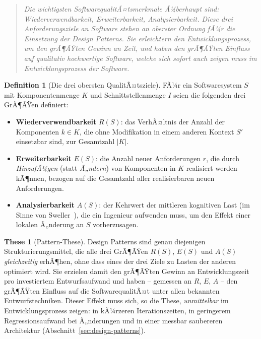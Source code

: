 ﻿\documentclass[a4paper,12pt]{report}
\theoremstyle{definition}
\newtheorem{definition}{Definition}[section]
\newtheorem{these}{These}[section]
\begin{document}
\begin{quotation}
\noindent\textit{%
Die wichtigsten SoftwarequalitÃ¤tsmerkmale Ã¼berhaupt sind: Wiederverwendbarkeit,
Erweiterbarkeit, Analysierbarkeit. Diese drei Anforderungsziele an Software stehen
an oberster Ordnung fÃ¼r die Einsetzung der Design Patterns. Sie erleichtern den
Entwicklungsprozess, um den grÃ¶ÃŸten Gewinn an Zeit, und haben den grÃ¶ÃŸten Einfluss
auf qualitativ hochwertige Software, welche sich sofort auch zeigen muss im
Entwicklungsprozess der Software.
}
\end{quotation}

\begin{definition}[Die drei obersten QualitÃ¤tsziele]
\label{def:qualitaetsziele}
FÃ¼r ein Softwaresystem $S$ mit Komponentenmenge $K$ und Schnittstellenmenge $I$
seien die folgenden drei GrÃ¶ÃŸen definiert:
\begin{itemize}
  \item \textbf{Wiederverwendbarkeit} $R(S)$: das VerhÃ¤ltnis der Anzahl der
  Komponenten $k \in K$, die ohne Modifikation in einem anderen Kontext $S'$
  einsetzbar sind, zur Gesamtzahl $|K|$.
  \item \textbf{Erweiterbarkeit} $E(S)$: die Anzahl neuer Anforderungen $r$, die
  durch \emph{HinzufÃ¼gen} (statt \emph{Ã„ndern}) von Komponenten in $K$ realisiert
  werden kÃ¶nnen, bezogen auf die Gesamtzahl aller realisierbaren neuen
  Anforderungen.
  \item \textbf{Analysierbarkeit} $A(S)$: der Kehrwert der mittleren kognitiven
  Last (im Sinne von Sweller~\cite{sweller1988}), die ein Ingenieur aufwenden
  muss, um den Effekt einer lokalen Ã„nderung an $S$ vorherzusagen.
\end{itemize}
\end{definition}

\begin{these}[Pattern-These]
\label{these:patterns}
Design Patterns sind genau diejenigen Strukturierungsmittel, die alle drei
GrÃ¶ÃŸen $R(S)$, $E(S)$ und $A(S)$ \emph{gleichzeitig} erhÃ¶hen, ohne dass eines
der drei Ziele zu Lasten der anderen optimiert wird. Sie erzielen damit den
grÃ¶ÃŸten Gewinn an Entwicklungszeit pro investiertem Entwurfsaufwand und haben
-- gemessen an $R$, $E$, $A$ -- den grÃ¶ÃŸten Einfluss auf die SoftwarequalitÃ¤t
unter allen bekannten Entwurfstechniken. Dieser Effekt muss sich, so die These,
\emph{unmittelbar} im Entwicklungsprozess zeigen: in kÃ¼rzeren Iterationszeiten,
in geringerem Regressionsaufwand bei Ã„nderungen und in einer messbar saubereren
Architektur (Abschnitt~\ref{sec:design-patterns}).
\end{these}
\end{document}
